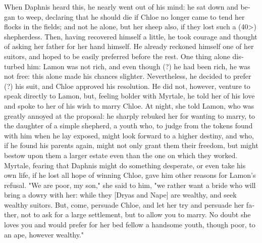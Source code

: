 \documentclass{book}
\begin{document}
\begin{pairs}
\begin{Rightside}
\begin{english}
  When Daphnis heard this, he nearly went out of his mind: he sat down and began to weep, declaring that he should die if Chloe no longer came to tend her flocks in the fields; and not he alone, but her sheep also, if they lost such a (40>) shepherdess.  Then, having recovered himself a little, he took courage and thought of asking her father for her hand himself.  He already reckoned himself one of her suitors, and hoped to be easily preferred before the rest.  One thing alone disturbed him: Lamon was not rich, and even though (?) he had been rich, he was not free: this alone made his chances slighter.  Nevertheless, he decided to prefer (?) his suit, and Chloe approved his resolution.  He did not, however, venture to speak directly to Lamon, but, feeling bolder with Myrtale, he told her of his love and spoke to her of his wish to marry Chloe.  At night, she told Lamon, who was greatly annoyed at the proposal: he sharply rebuked her for wanting to marry, to the daughter of a simple shepherd, a youth who, to judge from the tokens found with him when he lay exposed, might look forward to a higher destiny, and who, if he found his parents again, might not only grant them their freedom, but might bestow upon them a larger estate even than the one on which they worked.  Myrtale, fearing that Daphnis might do something desperate, or even take his own life, if he lost all hope of winning Chloe, gave him other reasons for Lamon's refusal.  "We are poor, my son," she said to him, "we rather want a bride who will bring a dowry with her: while they [Dryas and Nape] are wealthy, and seek wealthy suitors.  But, come, persuade Chloe, and let her try and persuade her father, not to ask for a large settlement, but to allow you to marry.  No doubt she loves you and would prefer for her bed fellow a handsome youth, though poor, to an ape, however wealthy."
\pend



\end{english}
\end{Rightside}
\end{pairs}
\end{document}
